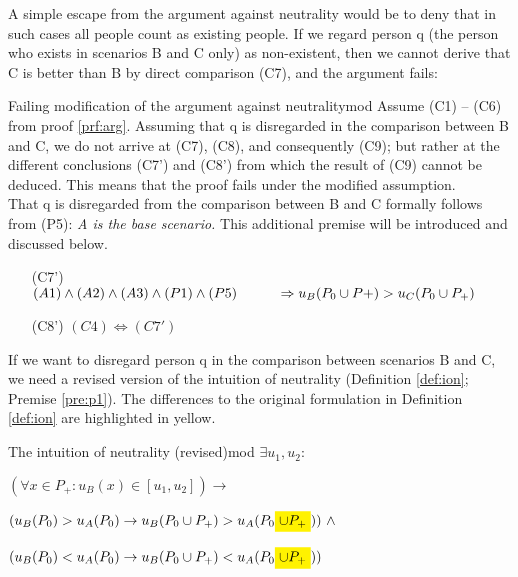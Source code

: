 A simple escape from the argument against neutrality would be to deny that in such cases all people count as existing people. If we regard person q (the person who exists in scenarios B and C only) as non-existent, then we cannot derive that C is better than B by direct comparison (C7), and the argument fails: 
\begin{Proof}{Failing modification of the argument against neutrality}{mod}
Assume (C1) -- (C6) from proof \ref{prf:arg}. Assuming that q is disregarded in the comparison between B and C, we do not arrive at (C7), (C8), and consequently (C9); but rather at the different conclusions (C7') and (C8') from which the result of (C9) cannot be deduced. This means that the proof fails under the modified assumption. \\
That q is disregarded from the comparison between B and C formally follows from (P5): \emph{A is the base scenario.} This additional premise will be introduced and discussed below. 
\begin{enumerate}
\item[(C7')] \hspace{1cm} $(A1) \wedge (A2) \wedge (A3) \wedge (P1) \wedge (P5) \\ 
\hspace*{1cm} \Rightarrow  u_B(P_0 \cup P+) > u_C(P_0 \cup P_+)$
\item[(C8')] \hspace{1cm} $(C4) \Leftrightarrow (C7')$ 
\end{enumerate}
\end{Proof}

If we want to disregard person q in the comparison between scenarios B and C, we need a revised version of the intuition of neutrality (Definition \ref{def:ion}; Premise \ref{pre:p1}). The differences to the original formulation in Definition \ref{def:ion} are highlighted in yellow. 

\begin{Definition}{The intuition of neutrality (revised)}{mod} 
$
  \exists u_1, u_2: 
$

\hspace{.5cm} $
  (\forall x \in P_+ : u_B(x) \in [u_1, u_2] )
  \rightarrow 
$

\hspace{1cm} $
  ( u_B(P_0) > u_A(P_0) 
  \rightarrow 
  u_B(P_0 \cup P_+) > u_A(P_0 \highlight{ \cup P_+}) ) 
  \ \wedge
$

\hspace{1cm} $
  ( u_B(P_0) < u_A(P_0) 
  \rightarrow 
  u_B(P_0 \cup P_+) < u_A(P_0 \highlight{ \cup P_+})) 
$
\end{Definition}

